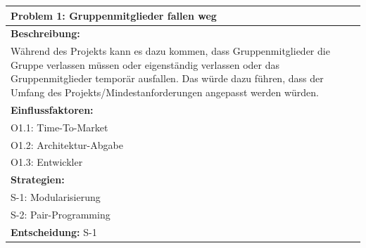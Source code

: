\documentclass[fontsize=12pt,paper=a4,twoside]{scrartcl}
\begin{document}
\begin{longtable}{|p{15cm}|}
\hline
Problem 1: Gruppenmitglieder fallen weg                                                                          
\\ \hline                                                                                                                                                                                                                                                                                                                                                                                                                                                                                                                                                        
\textbf{Beschreibung:} \\
Während des Projekts kann es dazu kommen, dass Gruppenmitglieder die Gruppe verlassen müssen oder eigenständig verlassen oder
das Gruppenmitglieder temporär ausfallen.
Das würde dazu führen, dass der Umfang des Projekts/Mindestanforderungen angepasst werden würden.
\\ \hline
\textbf{Einflussfaktoren:} \\
O1.1: Time-To-Market \\
O1.2: Architektur-Abgabe \\
O1.3: Entwickler
\\ \hline
\textbf{Strategien:} \\
S-1: Modularisierung \\
S-2: Pair-Programming
 \\ \hline
 \textbf{Entscheidung:} S-1
\\ \hline
\end{longtable}
\end{document}
